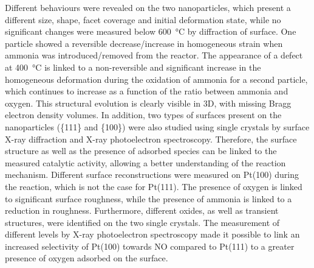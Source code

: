 \begin{mdframed}[linecolor=Prune,linewidth=1]
\begin{multicols}{2}
Different behaviours were revealed on the two nanoparticles, which present a different size, shape, facet coverage and initial deformation state, while no significant changes were measured below \qty{600}{\degreeCelsius} by diffraction of surface.
One particle showed a reversible decrease/increase in homogeneous strain when ammonia was introduced/removed from the reactor.
The appearance of a defect at \qty{400}{\degreeCelsius} is linked to a non-reversible and significant increase in the homogeneous deformation during the oxidation of ammonia for a second particle, which continues to increase as a function of the ratio between ammonia and oxygen.
This structural evolution is clearly visible in 3D, with missing Bragg electron density volumes.
In addition, two types of surfaces present on the nanoparticles (\{111\} and \{100\}) were also studied using single crystals by surface X-ray diffraction and X-ray photoelectron spectroscopy.
Therefore, the surface structure as well as the presence of adsorbed species can be linked to the measured catalytic activity, allowing a better understanding of the reaction mechanism.
Different surface reconstructions were measured on Pt(100) during the reaction, which is not the case for Pt(111).
The presence of oxygen is linked to significant surface roughness, while the presence of ammonia is linked to a reduction in roughness.
Furthermore, different oxides, as well as transient structures, were identified on the two single crystals.
The measurement of different levels by X-ray photoelectron spectroscopy made it possible to link an increased selectivity of Pt(100) towards NO compared to Pt(111) to a greater presence of oxygen adsorbed on the surface.
\end{multicols}

\end{mdframed}

\normalsize

\vspace{\fill}

\newpage\thispagestyle{empty}\null\newpage